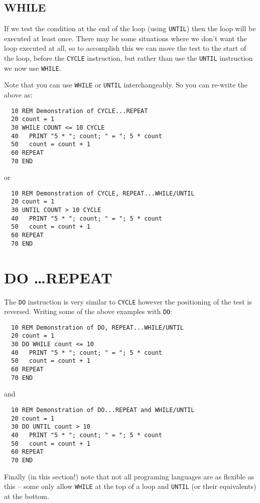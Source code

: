 \subsection{WHILE}
If we test the condition at the end of the loop (using {\tt UNTIL}) then
the loop will be executed at least once. There may be some situations
where we don't want the loop executed at all, so to accomplish this
we can move the test to the start of the loop, before the {\tt CYCLE}
instruction, but rather than use the {\tt UNTIL} instruction we now use
{\tt WHILE}.

\noindent
Note that you can use {\tt WHILE} or {\tt UNTIL} interchangeably. So
you can re-write the above as:
\begin{verbatim}
  10 REM Demonstration of CYCLE...REPEAT
  20 count = 1
  30 WHILE COUNT <= 10 CYCLE
  40   PRINT "5 * "; count; " = "; 5 * count
  50   count = count + 1
  60 REPEAT
  70 END
\end{verbatim}
or
\begin{verbatim}
  10 REM Demonstration of CYCLE, REPEAT...WHILE/UNTIL
  20 count = 1
  30 UNTIL COUNT > 10 CYCLE
  40   PRINT "5 * "; count; " = "; 5 * count
  50   count = count + 1
  60 REPEAT
  70 END
\end{verbatim}

\section{DO \dots REPEAT}

The {\tt DO} instruction is very similar to {\tt CYCLE}
however the positioning of the test is reversed. Writing some of the above examples with {\tt DO}:

\begin{verbatim}
  10 REM Demonstration of DO, REPEAT...WHILE/UNTIL
  20 count = 1
  30 DO WHILE count <= 10
  40   PRINT "5 * "; count; " = "; 5 * count
  50   count = count + 1
  60 REPEAT
  70 END
\end{verbatim}
and
\begin{verbatim}
  10 REM Demonstration of DO...REPEAT and WHILE/UNTIL
  20 count = 1
  30 DO UNTIL count > 10
  40   PRINT "5 * "; count; " = "; 5 * count
  50   count = count + 1
  60 REPEAT
  70 END
\end{verbatim}

Finally \meek (in this section!) note that not all programing languages
are as flexible as this -- some only allow {\tt WHILE} at the top of a
loop and {\tt UNTIL} (or their equivalents) at the bottom.


